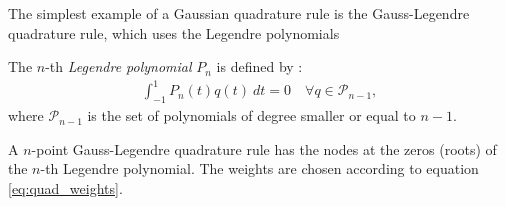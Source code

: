 The simplest example of a Gaussian quadrature rule is the Gauss-Legendre quadrature rule,
which uses the Legendre polynomials

\begin{definition}
    The $n$-th \emph{Legendre polynomial} $P_n$ is defined by \cite[Def.~7.4.2.16]{hiptmair_numerical_2020}:
    \begin{align}
        \int_{-1}^1 P_n(t) q(t) \ dt = 0 \quad \forall q \in \mathcal{P}_{n-1},
    \end{align}
    where $\mathcal{P}_{n-1}$ is the set of polynomials of degree smaller or equal to $n - 1$.

\end{definition}

\begin{definition}
    A $n$-point Gauss-Legendre quadrature rule has the nodes at the zeros (roots) of the $n$-th Legendre polynomial.
    The weights are chosen according to equation \ref{eq:quad_weights}.
\end{definition}


